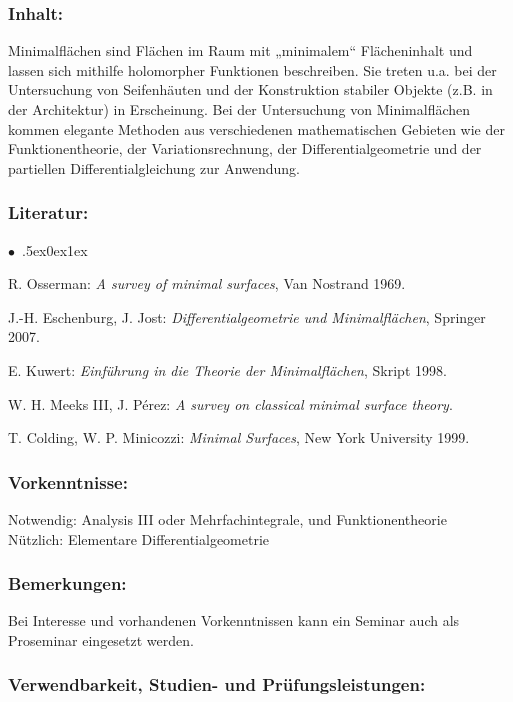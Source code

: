 \documentclass[a4paper,10pt]{article}
\renewenvironment{itemize}{\begin{list}{$\bullet$\ }{\itemsep.5ex\setlength{\topsep}{0.5\itemsep}\parsep0ex\labelsep1ex\settowidth{\labelwidth}{$\bullet$\ }\setlength{\leftmargin}{\labelwidth}\addtolength{\leftmargin}{3ex}\addtolength{\leftmargin}{\labelsep}}}{\end{list}}
\begin{document}
\subsubsection*{\large
    Inhalt:
}
Minimalflächen sind Flächen im Raum mit „minimalem“ Flächeninhalt und lassen sich mithilfe holomorpher Funktionen beschreiben. Sie treten u.a. bei der Untersuchung von Seifenhäuten und der Konstruktion stabiler Objekte (z.B. in der Architektur) in Erscheinung. Bei der Untersuchung von Minimalflächen kommen elegante Methoden aus verschiedenen mathematischen Gebieten wie der Funktionentheorie, der Variationsrechnung, der Differentialgeometrie und der partiellen Differentialgleichung zur Anwendung.
\subsubsection*{\large
    Literatur:
}
\begin{itemize}
\item
R. Osserman: \emph{A survey of minimal surfaces}, Van Nostrand 1969. 
\item
J.-H. Eschenburg, J. Jost: \emph{Differentialgeometrie und Minimalflächen}, Springer 2007.
\item
E. Kuwert: \emph{Einführung in die Theorie der Minimalflächen}, Skript 1998.
\item
W. H. Meeks III, J. Pérez: \emph{A survey on classical minimal surface theory}.
\item
T. Colding, W. P. Minicozzi: \emph{Minimal Surfaces}, New York University 1999.
\end{itemize}
\subsubsection*{\large
    Vorkenntnisse:
}
Notwendig: Analysis III oder Mehrfachintegrale, und Funktionentheorie \\ Nützlich: Elementare Differentialgeometrie
\subsubsection*{\large
    Bemerkungen:
}
Bei Interesse und vorhandenen Vorkenntnissen kann ein Seminar auch als Proseminar eingesetzt werden.
\cleardoublepage
\subsubsection*{\large
    Verwendbarkeit, Studien- und Prüfungsleistungen:
}
\end{document}
